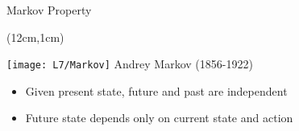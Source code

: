 \documentclass[11pt,aspectratio=169,handout]{beamer}
\begin{document}
  
  \begin{frame}{Markov Property}
   \begin{textblock*}{3cm}(12cm,1cm)
    \begin{center}\tiny
     \texttt{[image: L7/Markov]}
     \vspace{5pt}
     Andrey Markov (1856-1922)
    \end{center}
   \end{textblock*}
   \vspace{40pt}
   \begin{itemize}
   \setlength{\itemsep}{2em}
    \item<+-> Given present state, future and past are independent
    \item<+-> Future state depends only on current state and action
    \vspace{10pt}
   \end{itemize}
  \end{frame}
  
\end{document}
